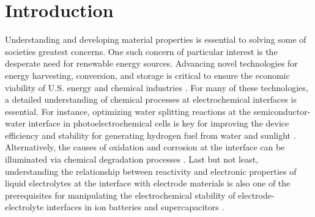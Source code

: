 \chapter{Introduction}

Understanding and developing material properties is essential to solving some of societies greatest concerns. One such concern of particular interest is the desperate need for renewable energy sources.
Advancing novel technologies for energy harvesting, conversion, and storage is critical to ensure the economic viability of U.S. energy and chemical industries \cite{eia,renewable}. For many of these technologies, a detailed understanding of chemical processes at electrochemical interfaces is essential. For instance, optimizing water splitting reactions at the semiconductor-water interface in photoelectrochemical cells is key for improving the device efficiency and stability for generating hydrogen fuel from water and sunlight \cite{mccrory2015}. Alternatively, the causes of oxidation and corrosion at the interface can be illuminated via chemical degradation processes \cite{huang2019}. Last but not least, understanding the relationship between reactivity and electronic properties of liquid electrolytes at the interface with electrode materials is also one of the prerequisites for manipulating the electrochemical stability of electrode-electrolyte interfaces in ion batteries and supercapacitors \cite{wang2018}.

